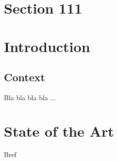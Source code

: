 \documentclass{paper}
\begin{document}
\section{Section 111}
\section{Introduction}
\subsection{Context}
Bla bla bla bla ...

\section{State of the Art}
Bref
\end{document}
